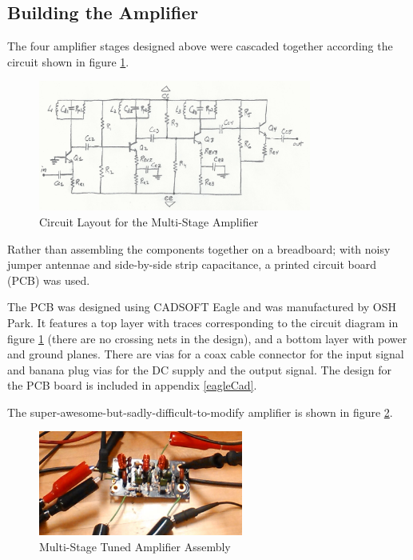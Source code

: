 \documentclass[titlepage, letterpaper, 10.5pt]{article}
\begin{document}
\subsection{Building the Amplifier}

The four amplifier stages designed above were cascaded together
according the circuit shown in figure \ref{multiStageTunedAmplifier}.

\begin{figure}[ht]
	\centering
	\includegraphics[width=0.8\textwidth]
		{figures/multiStageTunedAmplifier}
	\caption{Circuit Layout for the Multi-Stage Amplifier}
	\label{multiStageTunedAmplifier}
\end{figure}

Rather than assembling the components together on a breadboard; with
noisy jumper antennae and side-by-side strip capacitance, a printed
circuit board (PCB) was used. 

The PCB was designed using CADSOFT Eagle and was manufactured by OSH
Park. It features a top layer with traces corresponding to the circuit
diagram in figure \ref{multiStageTunedAmplifier} (there are no crossing
nets in the design), and a bottom layer with power and ground planes.
There are vias for a coax cable connector for the input signal and
banana plug vias for the DC supply and the output signal. The design
for the PCB board is included in appendix \ref{eagleCad}.

The super-awesome-but-sadly-difficult-to-modify amplifier is shown
in figure \ref{assembledAmplifier}.

\begin{figure}[ht]
	\centering
	\includegraphics[width=0.6\textwidth]
		{images/assembledAmplifier}
	\caption{Multi-Stage Tuned Amplifier Assembly}
	\label{assembledAmplifier}
\end{figure}
\end{document}
